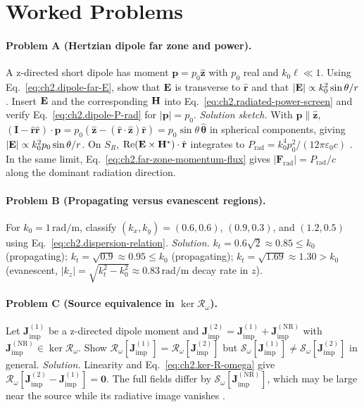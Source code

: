 
\section{Worked Problems}
\label{sec:ch02.11-problems}

\paragraph{Problem A (Hertzian dipole far zone and power).}
A z-directed short dipole has moment $\mathbf{p}=p_0\hat{\mathbf{z}}$ with $p_0$ real and $k_0\ell\ll1$. Using Eq.~\eqref{eq:ch2.dipole-far-E}, show that $\mathbf{E}$ is transverse to $\hat{\mathbf{r}}$ and that $|\mathbf{E}|\propto k_0^2\sin\theta/r$. Insert $\mathbf{E}$ and the corresponding $\mathbf{H}$ into Eq.~\eqref{eq:ch2.radiated-power-screen} and verify Eq.~\eqref{eq:ch2.dipole-P-rad} for $|\mathbf{p}|=p_0$. \emph{Solution sketch.} With $\mathbf{p}\parallel\hat{\mathbf{z}}$, $(\mathbf{I}-\hat{\mathbf{r}}\hat{\mathbf{r}})\cdot\mathbf{p}=p_0(\hat{\mathbf{z}}-(\hat{\mathbf{r}}\cdot\hat{\mathbf{z}})\hat{\mathbf{r}})=p_0\sin\theta\,\hat{\boldsymbol\theta}$ in spherical components, giving $|\mathbf{E}|\propto k_0^2 p_0\sin\theta/r$. On $S_R$, $\Re(\mathbf{E}\times\mathbf{H}^*)\cdot\hat{\mathbf{r}}$ integrates to $P_{\mathrm{rad}}=k_0^4 p_0^2/(12\pi\varepsilon_0 c)$ \cite{jackson1999,stratton1941}. In the same limit, Eq.~\eqref{eq:ch2.far-zone-momentum-flux} gives $|\mathbf{F}_{\mathrm{rad}}|=P_{\mathrm{rad}}/c$ along the dominant radiation direction.

\paragraph{Problem B (Propagating versus evanescent regions).}
For $k_0=1\,\mathrm{rad/m}$, classify $(k_x,k_y)=(0.6,0.6)$, $(0.9,0.3)$, and $(1.2,0.5)$ using Eq.~\eqref{eq:ch2.dispersion-relation}. \emph{Solution.} $k_t=0.6\sqrt{2}\approx0.85\le k_0$ (propagating); $k_t=\sqrt{0.9}\approx0.95\le k_0$ (propagating); $k_t=\sqrt{1.69}\approx1.30>k_0$ (evanescent, $|k_z|=\sqrt{k_t^2-k_0^2}\approx0.83\,\mathrm{rad/m}$ decay rate in $z$).

\paragraph{Problem C (Source equivalence in $\ker\mathcal{R}_\omega$).}
Let $\mathbf{J}^{(1)}_{\mathrm{imp}}$ be a z-directed dipole moment and $\mathbf{J}^{(2)}_{\mathrm{imp}}=\mathbf{J}^{(1)}_{\mathrm{imp}}+\mathbf{J}^{\mathrm{(NR)}}_{\mathrm{imp}}$ with $\mathbf{J}^{\mathrm{(NR)}}_{\mathrm{imp}}\in\ker\mathcal{R}_\omega$. Show $\mathcal{R}_\omega[\mathbf{J}^{(1)}_{\mathrm{imp}}]=\mathcal{R}_\omega[\mathbf{J}^{(2)}_{\mathrm{imp}}]$ but $\mathcal{S}_\omega[\mathbf{J}^{(1)}_{\mathrm{imp}}]\neq\mathcal{S}_\omega[\mathbf{J}^{(2)}_{\mathrm{imp}}]$ in general. \emph{Solution.} Linearity and Eq.~\eqref{eq:ch2.ker-R-omega} give $\mathcal{R}_\omega[\mathbf{J}^{(2)}_{\mathrm{imp}}-\mathbf{J}^{(1)}_{\mathrm{imp}}]=\mathbf{0}$. The full fields differ by $\mathcal{S}_\omega[\mathbf{J}^{\mathrm{(NR)}}_{\mathrm{imp}}]$, which may be large near the source while its radiative image vanishes \cite{devaney2004}.

